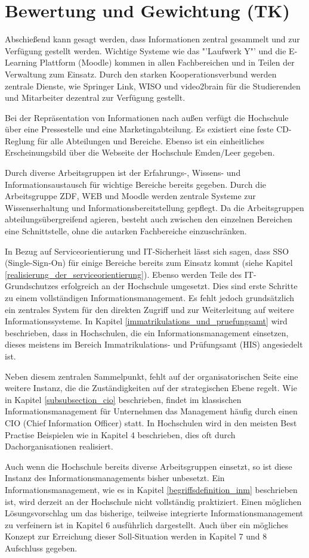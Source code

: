 \section{Bewertung und Gewichtung (TK)}
\label{section_bewertung_gewichtung}
Abschießend kann gesagt werden, dass Informationen zentral gesammelt und zur Verfügung gestellt werden. 
Wichtige Systeme wie das "'Laufwerk Y"' und die E-Learning Plattform (Moodle) kommen in allen 
Fachbereichen und in Teilen der Verwaltung zum Einsatz. Durch den starken Kooperationsverbund werden 
zentrale Dienste, wie Springer Link, WISO und video2brain für die Studierenden und Mitarbeiter dezentral zur 
Verfügung gestellt. 

Bei der Repräsentation von Informationen nach außen verfügt die Hochschule über eine Pressestelle und eine 
Marketingabteilung. Es existiert eine feste CD-Reglung für alle Abteilungen und Bereiche. Ebenso ist ein 
einheitliches Erscheinungsbild über die Webseite der Hochschule Emden/Leer gegeben.

Durch diverse Arbeitsgruppen ist der Erfahrungs-, Wissens- und Informationsaustausch für wichtige Bereiche 
bereits gegeben. Durch die Arbeitsgruppe ZDF, WEB und Moodle werden zentrale Systeme zur 
Wissenserhaltung und Informationsbereitstellung gepflegt. Da die Arbeitsgruppen abteilungsübergreifend 
agieren, besteht auch zwischen den einzelnen Bereichen eine Schnittstelle, ohne die autarken Fachbereiche 
einzuschränken. 

In Bezug auf Serviceorientierung und IT-Sicherheit lässt sich sagen, dass SSO (Single-Sign-On) für einige 
Bereiche bereits zum Einsatz kommt (siehe Kapitel \ref{realisierung_der_serviceorientierung}). Ebenso werden 
Teile des IT-Grundschutzes erfolgreich an der Hochschule umgesetzt. Dies sind erste Schritte zu einem 
vollständigen Informationsmanagement. Es fehlt jedoch grundsätzlich ein zentrales System für den direkten 
Zugriff und zur Weiterleitung auf weitere Informationssysteme. In Kapitel 
\ref{immatrikulations_und_pruefungsamt} wird beschrieben, dass in Hochschulen, die ein 
Informationsmanagement einsetzen, dieses meistens im Bereich Immatrikulations- und Prüfungsamt (HIS) 
angesiedelt ist. 

Neben diesem zentralen Sammelpunkt, fehlt auf der organisatorischen Seite eine weitere Instanz, die die 
Zuständigkeiten auf der strategischen Ebene regelt. Wie in Kapitel \ref{subsubsection_cio} beschrieben, findet im 
klassischen Informationsmanagement für Unternehmen das Management häufig durch einen CIO (Chief 
Information Officer) statt. In Hochschulen wird in den meisten Best Practise Beispielen wie in Kapitel 4 
beschrieben, dies oft durch Dachorganisationen realisiert.

Auch wenn die Hochschule bereits diverse Arbeitsgruppen einsetzt, so ist diese Instanz des 
Informationsmanagements bisher unbesetzt. Ein Informationsmanagement, wie es in Kapitel 
\ref{begriffsdefinition_inm} beschrieben ist, wird derzeit an der Hochschule nicht vollständig praktiziert. Einen 
möglichen Lösungsvorschlag um das bisherige, teilweise integrierte Informationsmanagement zu verfeinern 
ist in Kapitel 6 ausführlich dargestellt. Auch über ein mögliches Konzept zur Erreichung dieser Soll-Situation 
werden in Kapitel 7 und 8 Aufschluss gegeben.